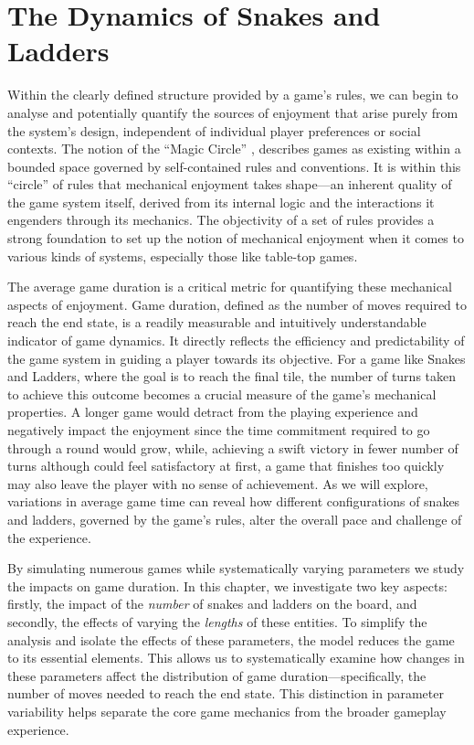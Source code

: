 \chapter{The Dynamics of Snakes and Ladders}

Within the clearly defined structure provided by a game's rules, we can begin to analyse and potentially quantify the sources of enjoyment that arise purely from the system's design, independent of individual player preferences or social contexts.  The notion of the ``Magic Circle'' \autocite{huizingaHomoLudensStudy1998}, describes games as existing within a bounded space governed by self-contained rules and conventions. It is within this ``circle'' of rules that mechanical enjoyment takes shape—an inherent quality of the game system itself, derived from its internal logic and the interactions it engenders through its mechanics. The objectivity of a set of rules provides a strong foundation to set up the notion of mechanical enjoyment when it comes to various kinds of systems, especially those like table-top games.
 
The average game duration is a critical metric for quantifying these mechanical aspects of enjoyment. Game duration, defined as the number of moves required to reach the end state, is a readily measurable and intuitively understandable indicator of game dynamics. It directly reflects the efficiency and predictability of the game system in guiding a player towards its objective. For a game like Snakes and Ladders, where the goal is to reach the final tile, the number of turns taken to achieve this outcome becomes a crucial measure of the game's mechanical properties. A longer game would detract from the playing experience and negatively impact the enjoyment since the time commitment required to go through a round would grow, while, achieving a swift victory in fewer number of turns although could feel satisfactory at first, a game that finishes too quickly may also leave the player with no sense of achievement. As we will explore, variations in average game time can reveal how different configurations of snakes and ladders, governed by the game's rules, alter the overall pace and challenge of the experience.

By simulating numerous games while systematically varying parameters we study the impacts on game duration. In this chapter, we investigate two key aspects: firstly, the impact of the \textit{number} of snakes and ladders on the board, and secondly, the effects of varying the \textit{lengths} of these entities. To simplify the analysis and isolate the effects of these parameters, the model reduces the game to its essential elements. This allows us to systematically examine how changes in these parameters affect the distribution of game duration—specifically, the number of moves needed to reach the end state. This distinction in parameter variability helps separate the core game mechanics from the broader gameplay experience.



